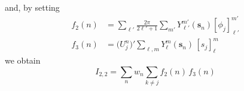 \documentclass[12pt,letterpaper,oneside]{article}
\theoremstyle{definition}
\begin{document}
and, by setting
\begin{align*}
f_2(n) & = \sum_{\ell'} \frac{2\pi}{2 \ell'+1} \sum_{m'} Y_{\ell'}^{m'}(\boldsymbol{s}_n) [\phi_j]_{\ell '}^{m '}  \\
f_3(n) & = \big( U_j^n \big)' \sum_{\ell,m} Y_\ell^m(\boldsymbol{s}_n) \, [s_j]_\ell^m
\end{align*}
we obtain
\[
I_{2,2} = \sum_n w_n \sum_{k \ne j} f_2(n) \, f_3(n)
\]

\end{document}

